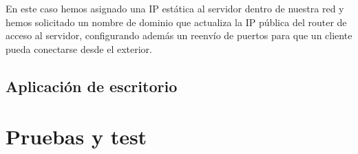 \documentclass[a4paper,10pt]{article}
\begin{document}
En este caso hemos asignado una IP estática al servidor dentro de
nuestra red y hemos solicitado un nombre de dominio que actualiza la
IP pública del router de acceso al servidor, configurando además un
reenvío de puertos para que un cliente pueda conectarse desde el exterior.

\newpage

\subsection{Aplicación de escritorio}

\newpage

\section{Pruebas y test}

\newpage


 
\end{document}
